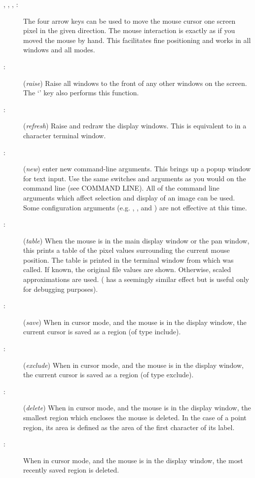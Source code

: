 \begin{description}
\item[, , , :]
	The four arrow keys can be used to move the mouse cursor one
	screen pixel in the given direction.  The mouse interaction is
	exactly as if you moved the mouse by hand.  This facilitates
	fine positioning and works in all windows and all modes.

\item[:]
	({\em raise}) Raise all {\SAO} windows to the front of any other
	windows on the screen.  The `' key also performs this function.

\item[:]
	({\em refresh}) Raise and redraw the display windows.  This is 
	equivalent to  in a character terminal window.

\item[:]
	({\em new}) enter new command-line arguments.  This brings up a popup
	window for text input.  Use the same switches and arguments as you
	would on the command line (see COMMAND LINE).  All of the command
	line arguments which affect selection and display of an image can
	be used.  Some configuration arguments (e.g. ,
	, and ) are not effective at this time.

\item[:]
	({\em table}) When the mouse is in the main display window or the pan
	window, this prints a table of the pixel values surrounding the
	current mouse position.  The table is printed in the terminal
	window from which {\SAO} was called.  If known, the original
	file values are shown.  Otherwise, scaled approximations are used.
	( has a seemingly similar effect but is useful only for debugging
	purposes).

\item[:]
	({\em save}) When in cursor mode, and the mouse is in the display
	window, the current cursor is saved as a region (of type include).

\item[:]
	({\em exclude}) When in cursor mode, and the mouse is in the display
	window, the current cursor is saved as a region (of type exclude).

\item[:]
	({\em delete}) When in cursor mode, and the mouse is in the display
	window, the smallest region which encloses the mouse is deleted.
	In the case of a point region, its area is defined as the area of
	the first character of its label.

\item[:]
	When in cursor mode, and the mouse is in the display window, the
	most recently saved region is deleted.
\end{description}


